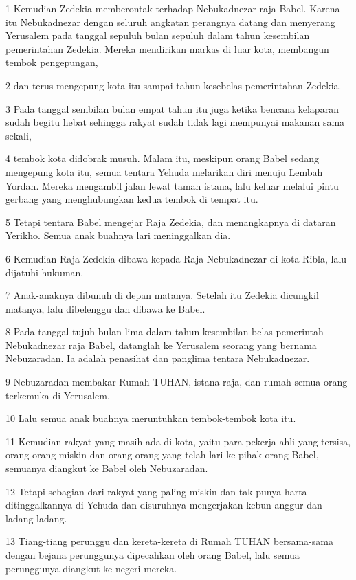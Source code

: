\par 1 Kemudian Zedekia memberontak terhadap Nebukadnezar raja Babel. Karena itu Nebukadnezar dengan seluruh angkatan perangnya datang dan menyerang Yerusalem pada tanggal sepuluh bulan sepuluh dalam tahun kesembilan pemerintahan Zedekia. Mereka mendirikan markas di luar kota, membangun tembok pengepungan,
\par 2 dan terus mengepung kota itu sampai tahun kesebelas pemerintahan Zedekia.
\par 3 Pada tanggal sembilan bulan empat tahun itu juga ketika bencana kelaparan sudah begitu hebat sehingga rakyat sudah tidak lagi mempunyai makanan sama sekali,
\par 4 tembok kota didobrak musuh. Malam itu, meskipun orang Babel sedang mengepung kota itu, semua tentara Yehuda melarikan diri menuju Lembah Yordan. Mereka mengambil jalan lewat taman istana, lalu keluar melalui pintu gerbang yang menghubungkan kedua tembok di tempat itu.
\par 5 Tetapi tentara Babel mengejar Raja Zedekia, dan menangkapnya di dataran Yerikho. Semua anak buahnya lari meninggalkan dia.
\par 6 Kemudian Raja Zedekia dibawa kepada Raja Nebukadnezar di kota Ribla, lalu dijatuhi hukuman.
\par 7 Anak-anaknya dibunuh di depan matanya. Setelah itu Zedekia dicungkil matanya, lalu dibelenggu dan dibawa ke Babel.
\par 8 Pada tanggal tujuh bulan lima dalam tahun kesembilan belas pemerintah Nebukadnezar raja Babel, datanglah ke Yerusalem seorang yang bernama Nebuzaradan. Ia adalah penasihat dan panglima tentara Nebukadnezar.
\par 9 Nebuzaradan membakar Rumah TUHAN, istana raja, dan rumah semua orang terkemuka di Yerusalem.
\par 10 Lalu semua anak buahnya meruntuhkan tembok-tembok kota itu.
\par 11 Kemudian rakyat yang masih ada di kota, yaitu para pekerja ahli yang tersisa, orang-orang miskin dan orang-orang yang telah lari ke pihak orang Babel, semuanya diangkut ke Babel oleh Nebuzaradan.
\par 12 Tetapi sebagian dari rakyat yang paling miskin dan tak punya harta ditinggalkannya di Yehuda dan disuruhnya mengerjakan kebun anggur dan ladang-ladang.
\par 13 Tiang-tiang perunggu dan kereta-kereta di Rumah TUHAN bersama-sama dengan bejana perunggunya dipecahkan oleh orang Babel, lalu semua perunggunya diangkut ke negeri mereka.
